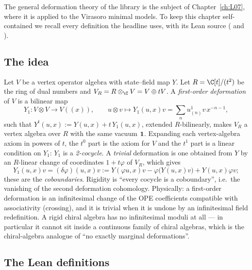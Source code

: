 The general deformation theory of the library is the subject of Chapter~\ref{ch:L07}, where it is
applied to the Virasoro minimal models. To keep this chapter self-contained we recall every
definition the headline uses, with its Lean source ( and
).

\subsection{The idea}

Let $V$ be a vertex operator algebra with state--field map $Y$. Let $R = \C[t]/(t^2)$ be the ring of
dual numbers and $V_R = R\otimes_\C V = V\oplus tV$. A \emph{first-order deformation} of $V$ is a
bilinear map
\begin{equation*}
  Y_1 : V\otimes V \to V((x)),\qquad u\otimes v\mapsto Y_1(u,x)v = \sum_n u^1_{(n)}v\,x^{-n-1},
\end{equation*}
such that $Y^t(u,x) := Y(u,x) + t\,Y_1(u,x)$, extended $R$-bilinearly, makes $V_R$ a vertex algebra
over $R$ with the same vacuum $\mathbf{1}$. Expanding each vertex-algebra axiom in powers of $t$, the
$t^0$ part is the axiom for $V$ and the $t^1$ part is a linear condition on $Y_1$: $Y_1$ is a
\emph{2-cocycle}. A \emph{trivial} deformation is one obtained from $Y$ by an $R$-linear change of
coordinates $1 + t\varphi$ of $V_R$, which gives
\begin{equation}\label{l09:eq:cobdy}
  Y_1(u,x)v = (\delta\varphi)(u,x)v := Y(\varphi u,x)v - \varphi\bigl(Y(u,x)v\bigr) + Y(u,x)\varphi v;
\end{equation}
these are the \emph{coboundaries}. Rigidity is ``every cocycle is a coboundary'', i.e.\ the
vanishing of the second deformation cohomology. Physically: a first-order deformation is an
infinitesimal change of the OPE coefficients compatible with associativity (crossing), and it is
trivial when it is undone by an infinitesimal field redefinition. A rigid chiral algebra has no
infinitesimal moduli at all --- in particular it cannot sit inside a continuous family of chiral
algebras, which is the chiral-algebra analogue of ``no exactly marginal deformations''.

\subsection{The Lean definitions}

